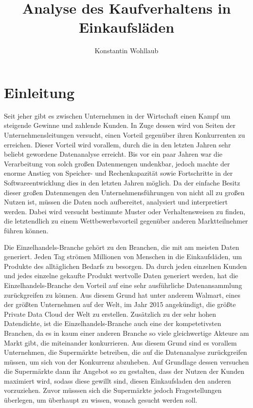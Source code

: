 \documentclass[usegeometry=true]{scrartcl}
\begin{document}
\subject{Projektbericht zum Modul Information Retrieval und Visualisierung Sommersemester 2022}
\title{Analyse des Kaufverhaltens in Einkaufsläden}
\author{Konstantin Wohllaub}%
\maketitle%

\section{Einleitung}
Seit jeher gibt es zwischen Unternehmen in der Wirtschaft einen Kampf um steigende Gewinne und zahlende Kunden.
In Zuge dessen wird von Seiten der Unternehmensleitungen versucht, einen Vorteil gegenüber ihren Konkurrenten zu erreichen.
Dieser Vorteil wird vorallem, durch die in den letzten Jahren sehr beliebt gewordene Datenanalyse erreicht.
Bis vor ein paar Jahren war die Verarbeitung von solch großen Datenmengen undenkbar,
jedoch machte der enorme Anstieg von Speicher- und Rechenkapazität sowie Fortschritte in der Softwareentwicklung dies in den letzten Jahren möglich.\cite[1]{emrouznejad2016big}
Da der einfache Besitz dieser großen Datenmengen den Unternehmensführungen von nicht all zu großen Nutzen ist, müssen die Daten noch aufbereitet, analysiert und interpretiert werden.\cite[1]{Tien2013}
Dabei wird versucht bestimmte Muster oder Verhaltensweisen zu finden, die letztendlich zu einem Wettbewerbsvorteil gegenüber anderen Marktteilnehmer führen können.

\noindent Die Einzelhandels-Branche gehört zu den Branchen, die mit am meisten Daten generiert.
Jeden Tag strömen Millionen von Menschen in die Einkaufsläden, um Produkte des alltäglichen Bedarfs zu besorgen.
Da durch jeden einzelnen Kunden und jedes einzelne gekaufte Produkt wertvolle Daten generiert werden, hat die Einzelhandels-Branche den Vorteil auf eine sehr ausführliche
Datenansammlung zurückgreifen zu können.
Aus diesem Grund hat unter anderem Walmart, eines der größten Unternehmen auf der Welt, im Jahr 2015 angekündigt, die größte Private Data Cloud der Welt
zu erstellen.\cite[5]{marr2016big}
Zusätzlich zu der sehr hohen Datendichte, ist die Einzelhandels-Branche auch eine der kompetetivsten Branchen, da es in kaum einer anderen Branche
so viele gleichwertige Akteure am Markt gibt, die miteinander konkurrieren.\cite{Grewal2010}
Aus diesem Grund sind es vorallem Unternehmen, die Supermärkte betreiben, die auf die Datenanalyse zurückgreifen müssen, um sich von der Konkurrenz abzuheben.
Auf Grundlage dessen versuchen die Supermärkte dann ihr Angebot so zu gestalten, dass der Nutzen der Kunden maximiert wird, sodass diese gewillt sind, diesen Einkaufsladen den anderen vorzuziehen.\cite[6]{marr2016big}
Zuvor müsssen sich die Supermärkte jedoch Fragestellungen überlegen, um überhaupt zu wissen, wonach gesucht werden soll.
\end{document}
